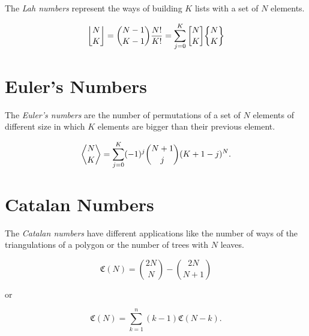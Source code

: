 The \emph{Lah numbers} represent the ways of building \(K\) lists with a set of \(N\) elements.

\[
	\genfrac{\lfloor}{\rfloor}{0pt}{}{N}{K} = \binom{N - 1}{K - 1} \frac{N!}{K!} = \sum_{j=0}^{K}
	\genfrac{[}{]}{0pt}{}{N}{K} \genfrac{\{}{\}}{0pt}{}{N}{K}
\]

\section{Euler's Numbers}

The \emph{Euler's numbers} are the number of permutations of a set of \(N\) elements of different size in which
\(K\) elements are bigger than their previous element.

\[
	\genfrac{\langle}{\rangle}{0pt}{}{N}{K} = \sum_{j = 0}^{K} (-1)^j \binom{N + 1}{j} (K + 1 - j)^N.
\]

\section{Catalan Numbers}

The \emph{Catalan numbers} have different applications like the number of ways of the triangulations of
a polygon or the number of trees with \(N\) leaves.

\[
	\mathfrak{C}(N) = \binom{2N}{N} - \binom{2N}{N + 1}
\]

or

\[
	\mathfrak{C}(N) = \sum_{k=1}^{n}(k - 1) \mathfrak{C}(N - k).
\]

